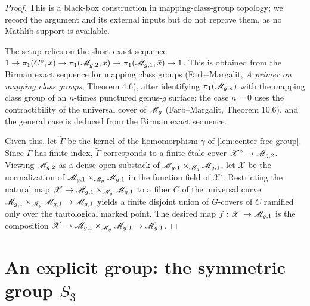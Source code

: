 \begin{proof}
  This is a black-box construction in mapping-class-group topology; we record
  the argument and its external inputs but do not reprove them, as no Mathlib
  support is available.

  The setup relies on the short exact sequence
  \(1 \to \pi_1(C^\circ, x) \to \pi_1(\mathscr{M}_{g,2}, x) \to \pi_1(\mathscr{M}_{g,1}, \bar{x})
  \to 1\). This is obtained from the Birman exact sequence for mapping class
  groups (Farb--Margalit, \emph{A primer on mapping class groups}, Theorem 4.6),
  after identifying \(\pi_1(\mathscr{M}_{g,n})\) with the mapping class group of an
  \(n\)-times punctured genus-\(g\) surface; the case \(n = 0\) uses the
  contractibility of the universal cover of \(\mathscr{M}_g\) (Farb--Margalit, Theorem
  10.6), and the general case is deduced from the Birman exact sequence.

  Given this, let \(\widetilde{\Gamma}\) be the kernel of the homomorphism
  \(\widetilde{\gamma}\) of \cref{lem:center-free-group}. Since \(\Gamma\) has
  finite index, \(\widetilde{\Gamma}\) corresponds to a finite étale cover
  \(\mathscr{X}^\circ \to \mathscr{M}_{g,2}\). Viewing \(\mathscr{M}_{g,2}\) as a dense open
  substack of \(\mathscr{M}_{g,1} \times_{\mathscr{M}_g} \mathscr{M}_{g,1}\), let \(\mathscr{X}\) be the
  normalization of \(\mathscr{M}_{g,1} \times_{\mathscr{M}_g} \mathscr{M}_{g,1}\) in the function field of
  \(\mathscr{X}^\circ\). Restricting the natural map
  \(\mathscr{X} \to \mathscr{M}_{g,1} \times_{\mathscr{M}_g} \mathscr{M}_{g,1}\) to a fiber \(C\) of the
  universal curve \(\mathscr{M}_{g,1} \times_{\mathscr{M}_g} \mathscr{M}_{g,1} \to \mathscr{M}_{g,1}\) yields a
  finite disjoint union of \(G\)-covers of \(C\) ramified only over the
  tautological marked point. The desired map \(f : \mathscr{X} \to \mathscr{M}_{g,1}\) is
  the composition
  \(\mathscr{X} \to \mathscr{M}_{g,1} \times_{\mathscr{M}_g} \mathscr{M}_{g,1} \to \mathscr{M}_{g,1}\).
\end{proof}

\section{An explicit group: the symmetric group \texorpdfstring{\(S_3\)}{S3}}

